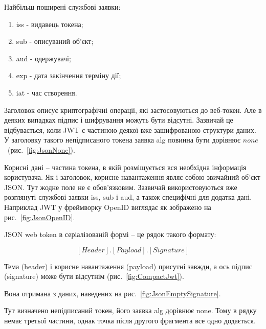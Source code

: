Найбільш поширені службові заявки:
\begin{enumerate}
	\item iss - видавець токена;
	\item sub - описуваний об'єкт;
	\item aud - одержувачі;
	\item exp - дата закінчення терміну дії;
	\item iat - час створення.
\end{enumerate}

Заголовок описує криптографічні операції, які застосовуються до веб-токен. Але в деяких випадках підпис і шифрування можуть бути відсутні. Зазвичай це відбувається, коли JWT є частиною деякої вже зашифрованою структури даних. У заголовку такого непідписаного токена заявка alg повинна бути дорівнює $none$~(рис.~\ref{fig:JsonNone}).


Корисні дані -- частина токена, в якій розміщується вся необхідна інформація користувача. Як і заголовок, корисне навантаження являє собою звичайний об'єкт JSON. Тут жодне поле не є обов'язковим. Зазвичай використовуються вже розглянуті службові заявки iss, sub і aud, а також специфічні для додатка дані. Наприклад JWT у фреймворку OpenID виглядає як зображено на рис.~\ref{fig:JsonOpenID}.


JSON web token в серіалізованій формі -- це рядок такого формату:

$$[Header].[Payload].[Signature]$$

Тема (header) і корисне навантаження (payload) присутні завжди, а ось підпис (signature) може бути відсутнім (рис.~\ref{fig:CompactJwt}).


Вона отримана з даних, наведених на рис.~\ref{fig:JsonEmptySignature}.


Тут визначено непідписаний токен, його заявка alg дорівнює none. Тому в рядку немає третьої частини, однак точка після другого фрагмента все одно додається.

